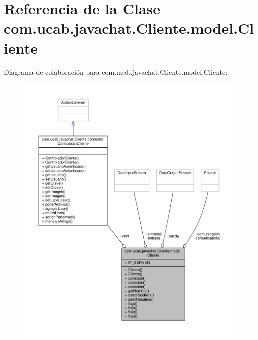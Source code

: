 \hypertarget{classcom_1_1ucab_1_1javachat_1_1_cliente_1_1model_1_1_cliente}{\section{Referencia de la Clase com.\-ucab.\-javachat.\-Cliente.\-model.\-Cliente}
\label{classcom_1_1ucab_1_1javachat_1_1_cliente_1_1model_1_1_cliente}
}


Diagrama de colaboración para com.\-ucab.\-javachat.\-Cliente.\-model.\-Cliente\-:
\nopagebreak
\begin{figure}[H]
\begin{center}
\leavevmode
\includegraphics[width=350pt]{d4/d13/classcom_1_1ucab_1_1javachat_1_1_cliente_1_1model_1_1_cliente__coll__graph}
\end{center}
\end{figure}
